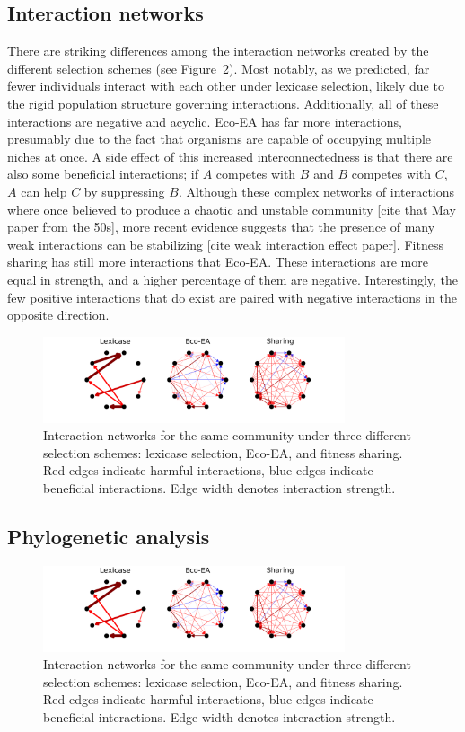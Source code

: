 \subsection{Interaction networks}
There are striking differences among the interaction networks created by the different selection schemes (see Figure~\ref{interaction_network}). Most notably, as we predicted, far fewer individuals interact with each other under lexicase selection, likely due to the rigid population structure governing interactions. Additionally, all of these interactions are negative and acyclic. Eco-EA has far more interactions, presumably due to the fact that organisms are capable of occupying multiple niches at once. A side effect of this increased interconnectedness is that there are also some beneficial interactions; if $A$ competes with $B$ and $B$ competes with $C$, $A$ can help $C$ by suppressing $B$. Although these complex networks of interactions where once believed to produce a chaotic and unstable community [cite that May paper from the 50s], more recent evidence suggests that the presence of many weak interactions can be stabilizing [cite weak interaction effect paper]. Fitness sharing has still more interactions that Eco-EA. These interactions are more equal in strength, and a higher percentage of them are negative. Interestingly, the few positive interactions that do exist are paired with negative interactions in the opposite direction. 
\begin{figure}
\includegraphics[width=3.5in]{figs/interaction_networks.png}
\caption{Interaction networks for the same community under three different selection schemes: lexicase selection, Eco-EA, and fitness sharing. Red edges indicate harmful interactions, blue edges indicate beneficial interactions. Edge width denotes interaction strength.}
\label{interaction_network}
\end{figure}

\subsection{Phylogenetic analysis}

\begin{figure}
\includegraphics[width=3.5in]{figs/interaction_networks.png}
\caption{Interaction networks for the same community under three different selection schemes: lexicase selection, Eco-EA, and fitness sharing. Red edges indicate harmful interactions, blue edges indicate beneficial interactions. Edge width denotes interaction strength.}
\label{interaction_network}
\end{figure}

